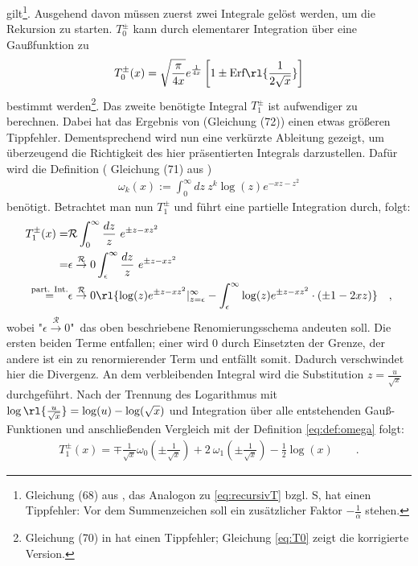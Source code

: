 %
gilt\footnote{Gleichung (68) aus \cite{av:1a}, das Analogon zu 
\ref{eq:recursivT} bzgl. S, hat einen Tippfehler: Vor dem 
Summenzeichen soll 
ein zusätzlicher Faktor $-\frac{1}{\alpha}$ stehen. }. Ausgehend davon müssen 
zuerst zwei Integrale gelöst werden, um die Rekursion zu starten. $T_0^\pm$ 
kann durch elementarer Integration über eine Gaußfunktion  zu 
%
\begin{align}\label{eq:T0}
T_0^\pm(x) = \sqrt{\frac{\pi}{4x}}e^{\frac{1}{4x}}\left[1\pm 
\text{Erf}\rl{\frac{1}{2\sqrt{x}}}\right]
\end{align}
%
bestimmt werden\footnote{Gleichung (70) in \cite{av:1a} hat einen Tippfehler; 
Gleichung \ref{eq:T0} zeigt die korrigierte Version. }. Das zweite benötigte 
Integral $T^\pm_1$ ist aufwendiger zu berechnen. Dabei hat das Ergebnis von 
\cite{av:1a} (Gleichung (72)) einen etwas größeren Tippfehler. Dementsprechend 
wird nun eine verkürzte Ableitung gezeigt, um überzeugend die 
Richtigkeit des 
hier präsentierten Integrals darzustellen. Dafür wird die Definition ( 
Gleichung (71) aus \cite{av:1a} )
%
\begin{align}\label{eq:def:omega}
\omega_k(x):=\int_{0}^{\infty}dz\ z^k\log(z)e^{-xz-z^2}
\end{align}
%
benötigt. Betrachtet man nun $T_1^\pm$ und führt eine partielle Integration 
durch, folgt:
%
\begin{align*}
T_1^\pm (x)=& \mathcal{R}\int_{0}^{\infty} \frac{dz}{z} \ e^{\pm z - xz^2}\\
           =&\epsilon\overset{\mathcal{R}}{\rightarrow}0
           \int_{\epsilon}^{\infty} \frac{dz}{z} \ e^{\pm z - xz^2}\\
\overset{\text{part. Int.}}{=}&\epsilon\overset{\mathcal{R}}{\rightarrow}0 
\rl{\log(z)e^{\pm z-xz^2}|_{z=\epsilon}^\infty - 
\int_{\epsilon}^{\infty}\log(z)e^{\pm z-xz^2} \cdot (\pm 1-2xz)}\quad,
\end{align*}
%
wobei "$\epsilon\overset{\mathcal{R}}{\rightarrow}0$"\ das oben 
beschriebene Renomierungsschema andeuten soll. Die ersten beiden Terme 
entfallen; einer wird 0 durch Einsetzten der Grenze, der andere ist ein zu 
renormierender Term und entfällt somit. Dadurch verschwindet hier die 
Divergenz. An dem verbleibenden Integral 
wird die Substitution $z=\frac{u}{\sqrt{x}}$ durchgeführt. Nach der Trennung 
des Logarithmus mit $\log\rl{\frac{u}{\sqrt{x}}}=\log(u)-\log(\sqrt{x})$ und 
Integration über alle entstehenden Gauß-Funktionen und 
anschließenden Vergleich 
mit der Definition \ref{eq:def:omega} folgt:
%
\begin{align}\label{eq:korr_T_1}
T_1^\pm(x)= \mp \frac{1}{\sqrt{x}} \omega_0(\pm \frac{1}{\sqrt{x}}) + 2\ 
\omega_1(\pm\frac{1}{\sqrt{x}})-\frac{1}{2}\log(x) \qquad.
\end{align}
